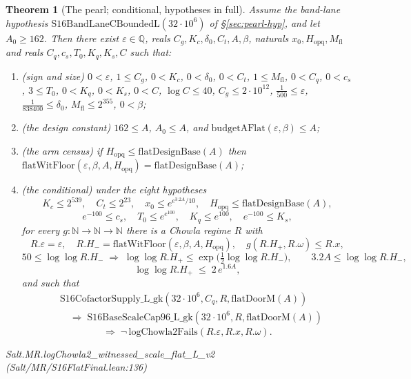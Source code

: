 \documentclass[11pt]{amsart}
\newcommand{\leanname}[1]{\par{\noindent\small\ttfamily\raggedright #1\par}}
\newtheorem{theorem}{Theorem}[section]
\theoremstyle{remark}
\begin{document}
\begin{theorem}[The pearl; conditional, hypotheses in full]\label{thm:pearl}
Assume the band-lane hypothesis
$\mathrm{S16BandLaneCBoundedL}(32\cdot10^{6})$ of \S\ref{sec:pearl-hyp}, and
let $A_0 \ge 162$. Then there exist $\varepsilon \in \mathbb{Q}$, reals
$C_g, K_c, \delta_0, C_t, A, \beta$, naturals $x_0, H_{\mathrm{opq}},
M_{\mathrm{fl}}$ and reals $C_q, c_s, T_0, K_q, K_s, C$ such that:
\begin{enumerate}
\item[(a)] \emph{(sign and size)} $0 < \varepsilon$, $1 \le C_g$, $0 < K_c$,
  $0 < \delta_0$, $0 < C_t$, $1 \le M_{\mathrm{fl}}$, $0 < C_q$, $0 < c_s$,
  $3 \le T_0$, $0 < K_q$, $0 < K_s$, $0 < C$, $\log C \le 40$,
  $C_g \le 2\cdot10^{12}$, $\tfrac{1}{500} \le \varepsilon$,
  $\tfrac{1}{838400} \le \delta_0$, $M_{\mathrm{fl}} \le 2^{355}$,
  $0 < \beta$;
\item[(b)] \emph{(the design constant)} $162 \le A$, $A_0 \le A$, and
  $\mathrm{budgetAFlat}(\varepsilon,\beta) \le A$;
\item[(c)] \emph{(the arm census)} if
  $H_{\mathrm{opq}} \le \mathrm{flatDesignBase}(A)$ then\\
  $\mathrm{flatWitFloor}(\varepsilon,\beta,A,H_{\mathrm{opq}})
   = \mathrm{flatDesignBase}(A)$;
\item[(d)] \emph{(the conditional)} under the eight hypotheses
\[
K_c \le 2^{539},\quad C_t \le 2^{23},\quad
x_0 \le e^{e^{3.2A}/10},\quad
H_{\mathrm{opq}} \le \mathrm{flatDesignBase}(A),
\]
\[
e^{-100}\le c_s,\quad T_0 \le e^{e^{100}},\quad K_q \le e^{100},\quad
e^{-100}\le K_s,
\]
for every $g : \mathbb{N}\to\mathbb{N}\to\mathbb{N}$ there is a Chowla regime
$R$ with
\[
R.\varepsilon = \varepsilon,\quad
R.H_- = \mathrm{flatWitFloor}(\varepsilon,\beta,A,H_{\mathrm{opq}}),\quad
g(R.H_+, R.\omega) \le R.x,
\]
\[
50 \le \log\log R.H_- \;\Rightarrow\;
\log\log R.H_+ \le \exp\bigl(\tfrac{1}{2}\log\log R.H_-\bigr),
\qquad
3.2A \le \log\log R.H_-,
\]
\[
\log\log R.H_+ \;\le\; 2\,e^{1.6A},
\]
and such that
\[
\begin{aligned}
&\mathrm{S16CofactorSupply\_L\_gk}(32\cdot10^{6}, C_q, R,
  \mathrm{flatDoorM}(A))\\
&\quad\Rightarrow\;
\mathrm{S16BaseScaleCap96\_L\_gk}(32\cdot10^{6}, R, \mathrm{flatDoorM}(A))
\end{aligned}
\]
\[
\Rightarrow\;
\lnot\,\mathrm{logChowla2Fails}(R.\varepsilon, R.x, R.\omega).
\]
\end{enumerate}
\leanname{Salt.MR.logChowla2\_witnessed\_scale\_flat\_L\_v2
(Salt/MR/S16FlatFinal.lean:136)}
\end{theorem}
\end{document}
